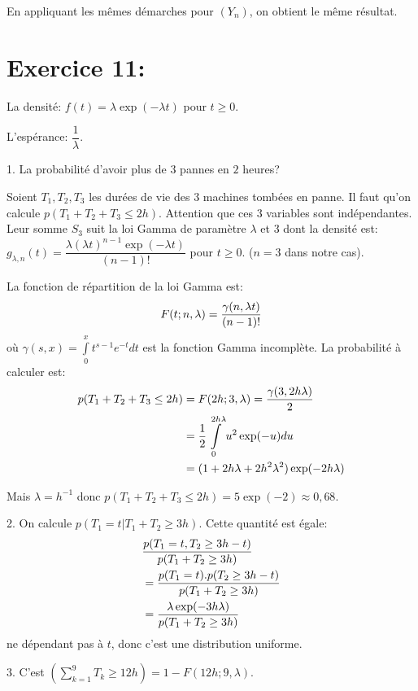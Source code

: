 \documentclass[a4paper,twoside,12pt]{article}
\begin{document}
En appliquant les mêmes démarches pour $(Y_n)$, on obtient le même résultat.

\section{Exercice 11:}

La densité: $f(t) = \lambda \exp(-\lambda t)$ pour $t \geq 0$.

L'espérance: $\dfrac{1}{\lambda}$.

1. La probabilité d'avoir plus de $3$ pannes en $2$ heures?

Soient $T_1, T_2, T_3$ les durées de vie des $3$ machines tombées en panne. Il faut qu'on calcule $p(T_1 + T_2 + T_3 \leq 2h)$. Attention que ces $3$ variables sont indépendantes. Leur somme $S_3$ suit la loi Gamma de paramètre $\lambda$ et $3$ dont la densité est: $g_{\lambda, n}(t) = \dfrac{\lambda (\lambda t)^{n-1}\exp(-\lambda t)}{(n-1)!}$ pour $t \geq 0$. ($n = 3$ dans notre cas).

La fonction de répartition de la loi Gamma est:
\begin{align}
    F(t; n, \lambda) = \dfrac{\gamma(n, \lambda t)}{(n-1)!} \notag
\end{align}
où $\gamma(s, x) = \int\limits_{0}^x t^{s-1}e^{-t}dt$ est la fonction Gamma incomplète. La probabilité à calculer est:
\begin{align}
    p(T_1 + T_2 + T_3 \leq 2h) &= F(2h; 3, \lambda) = \dfrac{\gamma(3, 2h\lambda)}{2} \notag \\
    &= \dfrac{1}{2}\int\limits_{0}^{2h\lambda}u^2\exp(-u)du \notag \\
    &= (1 + 2h\lambda + 2h^2\lambda^2)\exp(-2h\lambda) \notag
\end{align}

Mais $\lambda = h^{-1}$ donc $p(T_1 + T_2 + T_3 \leq 2h) = 5\exp(-2) \approx 0,68$.

2. On calcule $p(T_1 = t\vert T_1 + T_2 \geq 3h)$. Cette quantité est égale:
\begin{align}
    &\dfrac{p(T_1 = t, T_2 \geq 3h - t)}{p(T_1 + T_2 \geq 3h)} \notag \\
    &= \dfrac{p(T_1 = t).p(T_2 \geq 3h - t)}{p(T_1 + T_2 \geq 3h)} \notag \\
    &= \dfrac{\lambda \exp(-3h\lambda)}{p(T_1 + T_2 \geq 3h)} \notag
\end{align}
ne dépendant pas à $t$, donc c'est une distribution uniforme.

3. C'est $(\sum\limits_{k = 1}^9 T_k \geq 12h) = 1 - F(12h; 9, \lambda)$.
\end{document}
